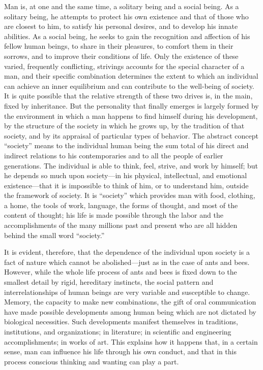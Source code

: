 \documentclass[12pt]{article}
\begin{document}
Man is, at one and the same time, a solitary being and a social being. As a solitary being, he attempts to protect his own existence and that of those who are closest to him, to satisfy his personal desires, and to develop his innate abilities. As a social being, he seeks to gain the recognition and affection of his fellow human beings, to share in their pleasures, to comfort them in their sorrows, and to improve their conditions of life. Only the existence of these varied, frequently conflicting, strivings accounts for the special character of a man, and their specific combination determines the extent to which an individual can achieve an inner equilibrium and can contribute to the well-being of society. It is quite possible that the relative strength of these two drives is, in the main, fixed by inheritance. But the personality that finally emerges is largely formed by the environment in which a man happens to find himself during his development, by the structure of the society in which he grows up, by the tradition of that society, and by its appraisal of particular types of behavior. The abstract concept “society” means to the individual human being the sum total of his direct and indirect relations to his contemporaries and to all the people of earlier generations. The individual is able to think, feel, strive, and work by himself; but he depends so much upon society—in his physical, intellectual, and emotional existence—that it is impossible to think of him, or to understand him, outside the framework of society. It is “society” which provides man with food, clothing, a home, the tools of work, language, the forms of thought, and most of the content of thought; his life is made possible through the labor and the accomplishments of the many millions past and present who are all hidden behind the small word “society.”

It is evident, therefore, that the dependence of the individual upon society is a fact of nature which cannot be abolished—just as in the case of ants and bees. However, while the whole life process of ants and bees is fixed down to the smallest detail by rigid, hereditary instincts, the social pattern and interrelationships of human beings are very variable and susceptible to change. Memory, the capacity to make new combinations, the gift of oral communication have made possible developments among human being which are not dictated by biological necessities. Such developments manifest themselves in traditions, institutions, and organizations; in literature; in scientific and engineering accomplishments; in works of art. This explains how it happens that, in a certain sense, man can influence his life through his own conduct, and that in this process conscious thinking and wanting can play a part.
\end{document}
